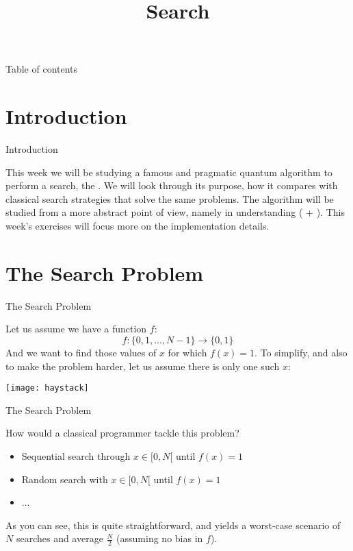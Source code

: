 \documentclass[aspectratio=43]{beamer}
\title{\q Search}
\begin{document}
\begin{frame}
	\titlepage
\end{frame}


\begin{frame}{Table of contents}
	\begin{card}
		\tableofcontents
	\end{card}
\end{frame}


\section{Introduction}
\begin{frame}{Introduction}
    \begin{card}
        This week we will be studying a famous and pragmatic quantum algorithm to perform a search, the \textbf{\gvsa}. We will look through its purpose, how it compares with classical search strategies that solve the same problems. The algorithm will be studied from a more abstract point of view, namely in understanding \textbf{\aamp} (\textbf{\phiv} + \textbf{\iatm}). This week's exercises will focus more on the implementation details.
    \end{card}
\pagenumber
\end{frame}


\section{The Search Problem}
\begin{frame}{The Search Problem}
    \begin{cardTiny}
        Let us assume we have a function $f$:
        \begin{equation*}
            f : \{0, 1, ..., N-1\} \rightarrow \{0,1\}
        \end{equation*}
        And we want to find those values of $x$ for which $f(x)=1$. To simplify, and also to make the problem harder, let us assume there is only one such $x$:
    \begin{center}
        \texttt{[image: haystack]}
    \end{center}
    \end{cardTiny}
\pagenumber
\end{frame}

\begin{frame}{The Search Problem}
    \begin{card}
        How would a classical programmer tackle this problem?
        \begin{itemize}
            \item Sequential search through $x \in [0, N[$ until $f(x)=1$
            \item Random search with $x \in [0, N[$ until $f(x)=1$
            \item ...
        \end{itemize}
        As you can see, this is quite straightforward, and yields a worst-case scenario of $N$ searches and average $\frac{N}{2}$ (assuming no bias in $f$).
    \end{card}
\pagenumber
\end{frame}
\end{document}
